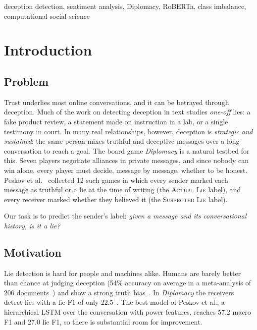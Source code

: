 \documentclass[conference]{IEEEtran}
\begin{document}
\begin{IEEEkeywords}
deception detection, sentiment analysis, Diplomacy, RoBERTa, class imbalance, computational social science
\end{IEEEkeywords}

\section{Introduction}
\label{sec:intro}

\subsection{Problem}
Trust underlies most online conversations, and it can be betrayed through deception. Much of the work on detecting deception in text studies \emph{one-off} lies: a fake product review, a statement made on instruction in a lab, or a single testimony in court. In many real relationships, however, deception is \emph{strategic and sustained}: the same person mixes truthful and deceptive messages over a long conversation to reach a goal. The board game \textit{Diplomacy} is a natural testbed for this. Seven players negotiate alliances in private messages, and since nobody can win alone, every player must decide, message by message, whether to be honest. Peskov et al.~\cite{peskov2020takes} collected 12 such games in which every sender marked each message as truthful or a lie at the time of writing (the \textsc{Actual Lie} label), and every receiver marked whether they believed it (the \textsc{Suspected Lie} label).

Our task is to predict the sender's label: \emph{given a message and its conversational history, is it a lie?}

\subsection{Motivation}
Lie detection is hard for people and machines alike. Humans are barely better than chance at judging deception (54\% accuracy on average in a meta-analysis of 206 documents~\cite{bond2006accuracy}) and show a strong truth bias~\cite{levine1999veracity}. In \textit{Diplomacy} the receivers detect lies with a lie F1 of only 22.5~\cite{peskov2020takes}. The best model of Peskov et al., a hierarchical LSTM over the conversation with power features, reaches 57.2 macro F1 and 27.0 lie F1, so there is substantial room for improvement.
\end{document}
